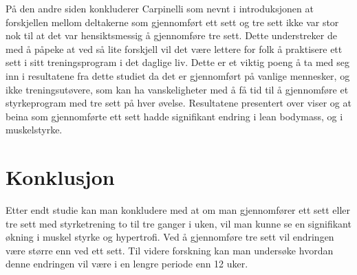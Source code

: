 \documentclass[
]{book}
\begin{document}
På den andre siden konkluderer Carpinelli \citep{carpinelli1998} som nevnt i introduksjonen at forskjellen mellom deltakerne som gjennomført ett sett og tre sett ikke var stor nok til at det var hensiktsmessig å gjennomføre tre sett. Dette understreker de med å påpeke at ved så lite forskjell vil det være lettere for folk å praktisere ett sett i sitt treningsprogram i det daglige liv. Dette er et viktig poeng å ta med seg inn i resultatene fra dette studiet da det er gjennomført på vanlige mennesker, og ikke treningsutøvere, som kan ha vanskeligheter med å få tid til å gjennomføre et styrkeprogram med tre sett på hver øvelse. Resultatene presentert over viser og at beina som gjennomførte ett sett hadde signifikant endring i lean bodymass, og i muskelstyrke.

\hypertarget{konklusjon-1}{%
\section{Konklusjon}\label{konklusjon-1}}

Etter endt studie kan man konkludere med at om man gjennomfører ett sett eller tre sett med styrketrening to til tre ganger i uken, vil man kunne se en signifikant økning i muskel styrke og hypertrofi. Ved å gjennomføre tre sett vil endringen være større enn ved ett sett. Til videre forskning kan man undersøke hvordan denne endringen vil være i en lengre periode enn 12 uker.

  
\end{document}
